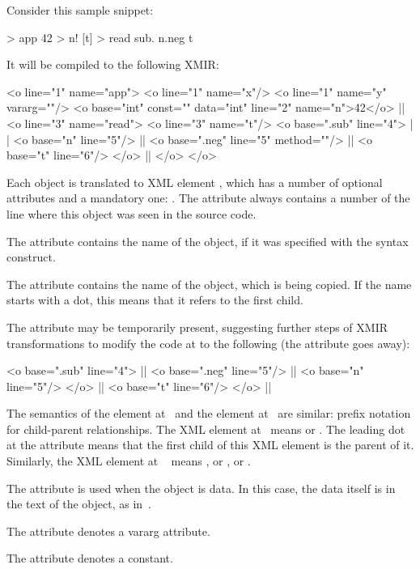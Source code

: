 Consider this sample \eo{} snippet:

\begin{ffcode}
[x y...] > app
  42 > n!
  [t] > read
    sub.
      n.neg
      t
\end{ffcode}

It will be compiled to the following XMIR:

\begin{ffcode}
<o line="1" name="app">
  <o line="1" name="x"/>
  <o line="1" name="y" vararg=""/>
  <o base="int" const="" data="int"
    line="2" name="n">42</o>   |$\label{ln:xml-data}$|
  <o line="3" name="read">
    <o line="3" name="t"/>
    <o base=".sub" line="4"> |$\label{ln:xml-sub}$|
      <o base="n" line="5"/> |$\label{ln:method-start}$|
      <o base=".neg" line="5" method=""/>  |$\label{ln:method-end}$|
      <o base="t" line="6"/>
    </o> |$\label{ln:xml-sub-end}$|
  </o>
</o>
\end{ffcode}

Each object is translated to XML element , which has
a number of optional attributes and a mandatory one: .
The attribute  always contains a number of the
line where this object was seen in the source code.

The attribute  contains the name of the object, if
it was specified with the \ff{>} syntax construct.

The attribute  contains the name of the object, which
is being copied. If the name starts with a dot, this means
that it refers to the first  child.

The attribute  may be temporarily present, suggesting
further steps of XMIR transformations to modify the code
at  to the following (the attribute 
goes away):

\begin{ffcode}
<o base=".sub" line="4"> |$\label{ln:new-sub}$|
  <o base=".neg" line="5"/> |$\label{ln:xml-neg}$|
    <o base="n" line="5"/>
  </o> |$\label{ln:xml-neg-end}$|
  <o base="t" line="6"/>
</o> |$\label{ln:new-sub-end}$|
\end{ffcode}

The semantics of the element  at~
and the element  at~ are similar: prefix
notation for child-parent relationships. The XML element at~
means  or . The
leading dot at the attribute  means that the first
child of this XML element is the \eo{} parent of it.
Similarly, the XML element at ~
means , or , or .

The attribute  is used when the object is data. In this
case, the data itself is in the text of the object, as in~.

The attribute  denotes a vararg attribute.

The attribute  denotes a constant.
